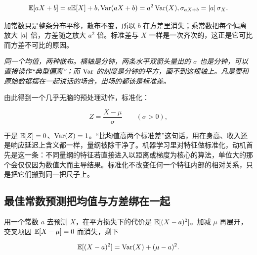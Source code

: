 \[
\mathbb{E}[aX+b]=a\mathbb{E}[X]+b,\space
\operatorname{Var}(aX+b)=a^2\operatorname{Var}(X),\space
\sigma_{aX+b}=\left|a\right|\sigma_X.
\]

加常数只是整条分布平移，散布不变，所以 \(b\) 在方差里消失；乘常数把每个偏离放大 \(\left|a\right|\) 倍，方差随之放大 \(a^2\) 倍。标准差与 \(X\) 一样是一次齐次的，这正是它可比而方差不可比的原因。

\begin{center}

\emph{同一个均值，两种散布。横轴是分钟，两条水平双箭头量出的 \(\sigma\) 也是分钟，可以直接读作``典型偏离''；而 \(\operatorname{Var}\) 的刻度是分钟的平方，画不到这根轴上。凡是要和原始数据摆在一起说话的场合，出场的都该是标准差。}
\end{center}

由此得到一个几乎无脑的预处理动作，标准化：

\[
Z=\frac{X-\mu}{\sigma}\qquad(\sigma>0),
\]

于是 \(\mathbb{E}[Z]=0\)、\(\operatorname{Var}(Z)=1\)。``比均值高两个标准差''这句话，用在身高、收入还是响应延迟上含义都一样，量纲被除干净了。机器学习里对特征做标准化，动机首先是这一条：不同量纲的特征若直接进入以距离或梯度为核心的算法，单位大的那个会仅仅因为数值大而主导结果。标准化不改变任何一个特征内部的相对关系，只是把它们搬到同一把尺子上。

\subsection{最佳常数预测把均值与方差绑在一起}

用一个常数 \(a\) 去预测 \(X\)，在平方损失下的代价是 \(\mathbb{E}[(X-a)^2]\)。加减 \(\mu\) 再展开，交叉项因 \(\mathbb{E}[X-\mu]=0\) 而消失，剩下

\[
\mathbb{E}[(X-a)^2]=\operatorname{Var}(X)+(\mu-a)^2.
\]

